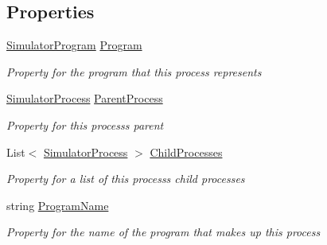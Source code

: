 \subsection*{Properties}
\begin{DoxyCompactItemize}
\item 
\hyperlink{class_c_p_u___o_s___simulator_1_1_c_p_u_1_1_simulator_program}{Simulator\+Program} \hyperlink{class_c_p_u___o_s___simulator_1_1_operating___system_1_1_simulator_process_a594fe15fec1c942ccfbcfa9c345624ee}{Program}
\begin{DoxyCompactList}\small\item\em Property for the program that this process represents \end{DoxyCompactList}\item 
\hyperlink{class_c_p_u___o_s___simulator_1_1_operating___system_1_1_simulator_process}{Simulator\+Process} \hyperlink{class_c_p_u___o_s___simulator_1_1_operating___system_1_1_simulator_process_a4af765ee1a2e9390c9de86fd842a8458}{Parent\+Process}
\begin{DoxyCompactList}\small\item\em Property for this process\textquotesingle{}s parent \end{DoxyCompactList}\item 
List$<$ \hyperlink{class_c_p_u___o_s___simulator_1_1_operating___system_1_1_simulator_process}{Simulator\+Process} $>$ \hyperlink{class_c_p_u___o_s___simulator_1_1_operating___system_1_1_simulator_process_a2bcf12b1ea3ce8c369f53eccf1368277}{Child\+Processes}
\begin{DoxyCompactList}\small\item\em Property for a list of this process\textquotesingle{}s child processes \end{DoxyCompactList}\item 
string \hyperlink{class_c_p_u___o_s___simulator_1_1_operating___system_1_1_simulator_process_adbe9e17fd9415e4417646309fefbf44b}{Program\+Name}
\begin{DoxyCompactList}\small\item\em Property for the name of the program that makes up this process \end{DoxyCompactList}\item 

\end{DoxyCompactItemize}
